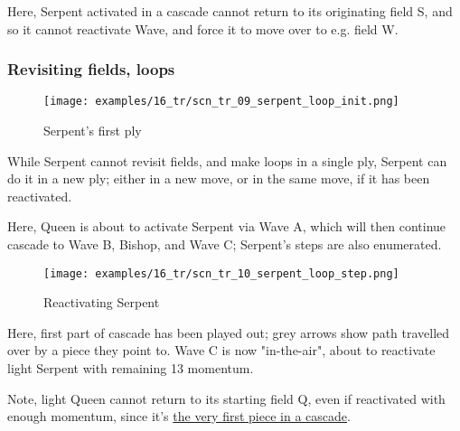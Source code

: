 Here, Serpent activated in a cascade cannot return to its originating field S,
and so it cannot reactivate Wave, and force it to move over to e.g. field W.

\clearpage %

\subsubsection*{Revisiting fields, loops}
\label{sec:Tamoanchan Revisited/Serpent/Movement/Revisiting fields, loops}

\vspace*{-1.2\baselineskip}
\noindent
\begin{figure}[!h]
\texttt{[image: examples/16\_tr/scn\_tr\_09\_serpent\_loop\_init.png]}
\caption{Serpent's first ply}
\label{fig:scn_tr_09_serpent_loop_init}
\end{figure}

While Serpent cannot revisit fields, and make loops in a single ply, Serpent can
do it in a new ply; either in a new move, or in the same move, if it has been
reactivated.

Here, Queen is about to activate Serpent via Wave A, which will then continue
cascade to Wave B, Bishop, and Wave C; Serpent's steps are also enumerated.

\clearpage %

\vspace*{-2.1\baselineskip}
\noindent
\begin{figure}[!h]
\texttt{[image: examples/16\_tr/scn\_tr\_10\_serpent\_loop\_step.png]}
\caption{Reactivating Serpent}
\label{fig:scn_tr_10_serpent_loop_step}
\end{figure}

Here, first part of cascade has been played out; grey arrows show path travelled
over by a piece they point to. Wave C is now "in-the-air", about to reactivate
light Serpent with remaining 13 momentum.

Note, light Queen cannot return to its starting field Q, even if reactivated with
enough momentum, since it's
\hyperref[fig:scn_mv_43_static_move_is_illegal_init]{the very first piece in a cascade}.

\clearpage %

